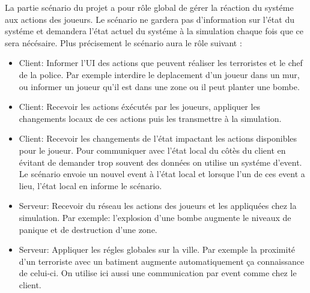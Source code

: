 La partie scénario du projet a pour rôle global de gérer la réaction du systéme aux actions des joueurs. Le scénario ne gardera pas d'information sur l'état du systéme et demandera l'état actuel du systéme à la simulation chaque fois que ce sera nécésaire. Plus précisement le scénario aura le rôle suivant :
\begin{itemize}
\item Client: Informer l'UI des actions que peuvent réaliser les terroristes et le chef de la police. Par exemple interdire le deplacement d'un joueur dans un mur, ou informer un joueur qu'il est dans une zone ou il peut planter une bombe. 
\item Client: Recevoir les actions éxécutés par les joueurs, appliquer les changements locaux de ces actions puis les transmettre à la simulation.
\item Client: Recevoir les changements de l'état impactant les actions disponibles pour le joueur. Pour communiquer avec l'état local du côtès du client en évitant de demander trop souvent des données on utilise un systéme d'event. Le scénario envoie un nouvel event à l'état local et lorsque l'un de ces event a lieu, l'état local en informe le scénario.
\item Serveur: Recevoir du réseau les actions des joueurs et les appliquées chez la simulation. Par exemple: l'explosion d'une bombe augmente le niveaux de panique et de destruction d'une zone.
\item Serveur: Appliquer les régles globales sur la ville. Par exemple la proximité d'un terroriste avec un batiment augmente automatiquement ça connaissance de celui-ci. On utilise ici aussi une communication par event comme chez le client.
\end{itemize}
